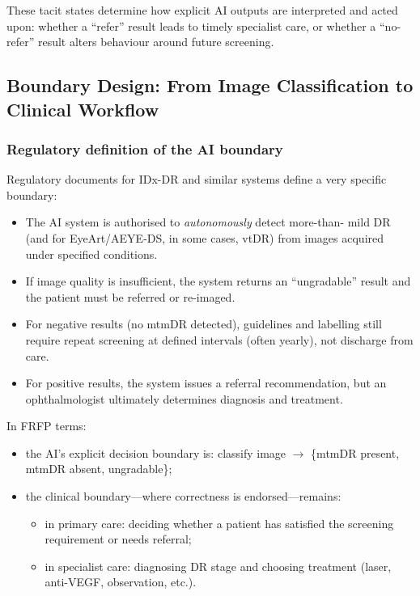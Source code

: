 These tacit states determine how explicit AI outputs are interpreted and
acted upon: whether a ``refer'' result leads to timely specialist care, or
whether a ``no-refer'' result alters behaviour around future screening.

\subsection{Boundary Design:
  From Image Classification to Clinical Workflow}

\subsubsection*{Regulatory definition of the AI boundary}

Regulatory documents for IDx-DR and similar systems define a very specific
boundary:

\begin{itemize}
  \item The AI system is authorised to \emph{autonomously} detect more-than-
        mild DR (and for EyeArt/AEYE-DS, in some cases, vtDR) from images
        acquired under specified conditions.
  \item If image quality is insufficient, the system returns an
        ``ungradable'' result and the patient must be referred or re-imaged.
  \item For negative results (no mtmDR detected), guidelines and labelling
        still require repeat screening at defined intervals (often yearly),
        not discharge from care.
  \item For positive results, the system issues a referral recommendation,
        but an ophthalmologist ultimately determines diagnosis and
        treatment.
\end{itemize}

In FRFP terms:

\begin{itemize}
  \item the AI’s explicit decision boundary is: classify image $\to$
        \{mtmDR present, mtmDR absent, ungradable\};
  \item the clinical boundary---where correctness is endorsed---remains:
        \begin{itemize}
          \item in primary care: deciding whether a patient has satisfied
                the screening requirement or needs referral;
          \item in specialist care: diagnosing DR stage and choosing
                treatment (laser, anti-VEGF, observation, etc.).
        \end{itemize}
\end{itemize}

